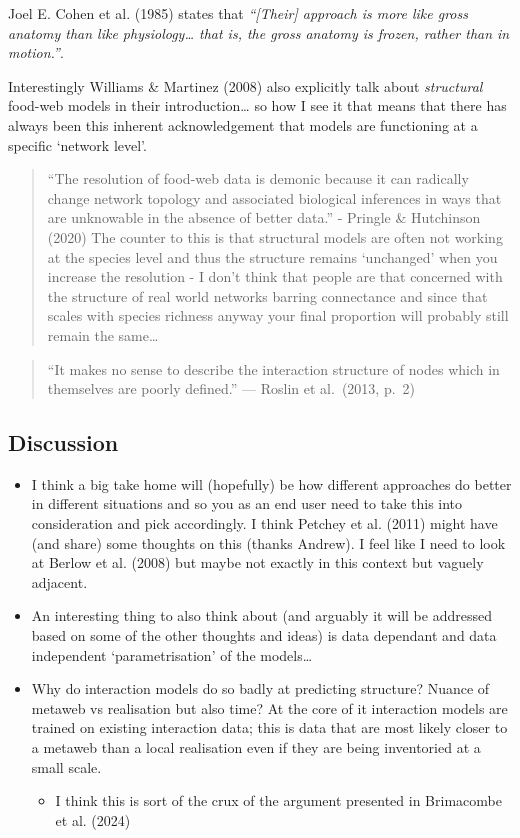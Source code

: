 \documentclass[
]{agujournal2019}
\providecommand{\tightlist}{%
  \setlength{\itemsep}{0pt}\setlength{\parskip}{0pt}}\usepackage{longtable,booktabs,array}
\begin{document}
Joel E. Cohen et al. (1985) states that \emph{``{[}Their{]} approach is
more like gross anatomy than like physiology\ldots{} that is, the gross
anatomy is frozen, rather than in motion.''}.

Interestingly Williams \& Martinez (2008) also explicitly talk about
\emph{structural} food-web models in their introduction\ldots{} so how I
see it that means that there has always been this inherent
acknowledgement that models are functioning at a specific `network
level'.

\begin{quote}
``The resolution of food-web data is demonic because it can radically
change network topology and associated biological inferences in ways
that are unknowable in the absence of better data.'' - Pringle \&
Hutchinson (2020) The counter to this is that structural models are
often not working at the species level and thus the structure remains
`unchanged' when you increase the resolution - I don't think that people
are that concerned with the structure of real world networks barring
connectance and since that scales with species richness anyway your
final proportion will probably still remain the same\ldots{}
\end{quote}

\begin{quote}
``It makes no sense to describe the interaction structure of nodes which
in themselves are poorly defined.'' --- Roslin et al.~(2013, p.~2)
\end{quote}

\subsection{Discussion}\label{discussion}

\begin{itemize}
\item
  I think a big take home will (hopefully) be how different approaches
  do better in different situations and so you as an end user need to
  take this into consideration and pick accordingly. I think Petchey et
  al. (2011) might have (and share) some thoughts on this (thanks
  Andrew). I feel like I need to look at Berlow et al. (2008) but maybe
  not exactly in this context but vaguely adjacent.
\item
  An interesting thing to also think about (and arguably it will be
  addressed based on some of the other thoughts and ideas) is data
  dependant and data independent `parametrisation' of the models\ldots{}
\item
  Why do interaction models do so badly at predicting structure? Nuance
  of metaweb vs realisation but also time? At the core of it interaction
  models are trained on existing interaction data; this is data that are
  most likely closer to a metaweb than a local realisation even if they
  are being inventoried at a small scale.

  \begin{itemize}
  \tightlist
  \item
    I think this is sort of the crux of the argument presented in
    Brimacombe et al. (2024)
  \end{itemize}
\end{itemize}
\end{document}
